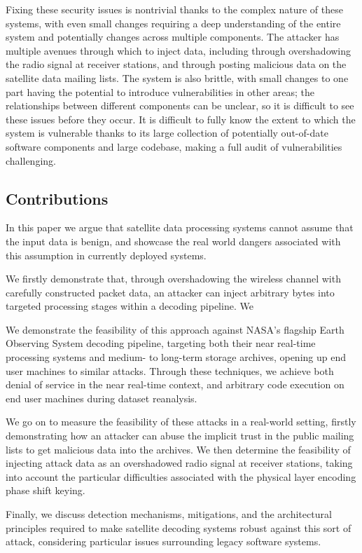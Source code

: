 Fixing these security issues is nontrivial thanks to the complex nature of these systems, with even small changes requiring a deep understanding of the entire system and potentially changes across multiple components.
The attacker has multiple avenues through which to inject data, including through overshadowing the radio signal at receiver stations, and through posting malicious data on the satellite data mailing lists.
The system is also brittle, with small changes to one part having the potential to introduce vulnerabilities in other areas; the relationships between different components can be unclear, so it is difficult to see these issues before they occur.
It is difficult to fully know the extent to which the system is vulnerable thanks to its large collection of potentially out-of-date software components and large codebase, making a full audit of vulnerabilities challenging.

\subsection{Contributions}

In this paper we argue that satellite data processing systems cannot assume that the input data is benign, and showcase the real world dangers associated with this assumption in currently deployed systems.

We firstly demonstrate that, through overshadowing the wireless channel with carefully constructed packet data, an attacker can inject arbitrary bytes into targeted processing stages within a decoding pipeline.
We 

We demonstrate the feasibility of this approach against NASA's flagship Earth Observing System decoding pipeline, targeting both their near real-time processing systems and medium- to long-term storage archives, opening up end user machines to similar attacks.
Through these techniques, we achieve both denial of service in the near real-time context, and arbitrary code execution on end user machines during dataset reanalysis.

We go on to measure the feasibility of these attacks in a real-world setting, firstly demonstrating how an attacker can abuse the implicit trust in the public mailing lists to get malicious data into the archives.
We then determine the feasibility of injecting attack data as an overshadowed radio signal at receiver stations, taking into account the particular difficulties associated with the physical layer encoding phase shift keying.

Finally, we discuss detection mechanisms, mitigations, and the architectural principles required to make satellite decoding systems robust against this sort of attack, considering particular issues surrounding legacy software systems.
